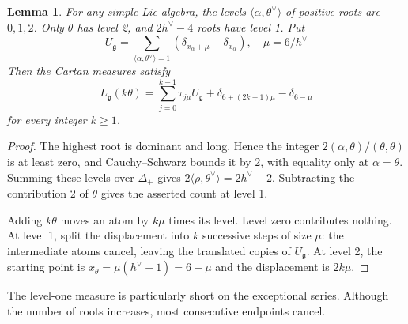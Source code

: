 \documentclass[11pt,reqno]{amsart}
\newtheorem{lemma}[thm]{Lemma}
\theoremstyle{definition}
\numberwithin{equation}{section}
\begin{document}
\begin{lemma}\label{lem:levels}
For any simple Lie algebra, the levels $\langle\alpha,\theta^\vee\rangle$ of positive roots are $0,1,2$. Only $\theta$ has level 2, and $2h^\vee-4$ roots have level 1. Put
$$U_{\mathfrak g}=\sum_{\langle\alpha,\theta^\vee\rangle=1}(\delta_{x_\alpha+\mu}-\delta_{x_\alpha}),\quad \mu=6/h^\vee$$
Then the Cartan measures satisfy
$$L_{\mathfrak g}(k\theta)=\sum_{j=0}^{k-1}\tau_{j\mu}U_{\mathfrak g}+\delta_{6+(2k-1)\mu}-\delta_{6-\mu}$$
for every integer $k\geq1$.
\end{lemma}
\begin{proof}
The highest root is dominant and long. Hence the integer $2(\alpha,\theta)/(\theta,\theta)$ is at least zero, and Cauchy--Schwarz bounds it by 2, with equality only at $\alpha=\theta$. Summing these levels over $\Delta_+$ gives $2\langle\rho,\theta^\vee\rangle=2h^\vee-2$. Subtracting the contribution 2 of $\theta$ gives the asserted count at level 1.

Adding $k\theta$ moves an atom by $k\mu$ times its level. Level zero contributes nothing. At level 1, split the displacement into $k$ successive steps of size $\mu$: the intermediate atoms cancel, leaving the translated copies of $U_{\mathfrak g}$. At level 2, the starting point is $x_\theta=\mu(h^\vee-1)=6-\mu$ and the displacement is $2k\mu$.
\end{proof}

The level-one measure is particularly short on the exceptional series. Although the number of roots increases, most consecutive endpoints cancel.
\end{document}
